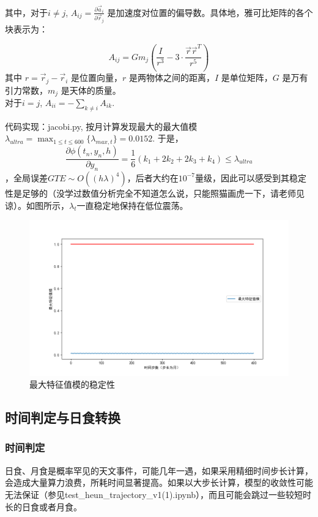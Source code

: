 \documentclass[hidelinks]{article}
\newcommand{\dps}{\displaystyle}
\begin{document}
其中，对于$i \neq j$, \( A_{ij} = \frac{\partial \vec{a}_i}{\partial \vec{r}_j} \) 是加速度对位置的偏导数。具体地，雅可比矩阵的各个块表示为：

\[
A_{ij} = G m_j \left( \frac{I}{r^3} - 3 \cdot \frac{\vec{r} \vec{r}^T}{r^5} \right)
\]
其中 \( r = \vec{r}_j - \vec{r}_i \) 是位置向量，\( r \) 是两物体之间的距离，\( I \) 是单位矩阵，\( G \) 是万有引力常数，\( m_j \) 是天体的质量。
\\
对于$i = j$, $\dps A_{ii} = - \sum_{k\neq i}A_{ik}$.

代码实现：jacobi.py, 按月计算发现最大的最大值模$\lambda_{ultra} = \max_{1\le t\le 600}\{\lambda_{max, t}\} = 0.0152$. 于是，
$$\frac{\partial \phi(t_n, y_n, h)}{\partial y_n} = \frac 1 6(k_1 + 2k_2 + 2k_3 + k_4) \le \lambda_{ultra}$$，全局误差$GTE \sim O((h\lambda)^4)$，后者大约在$10^{-7}$量级，因此可以感受到其稳定性是足够的（没学过数值分析完全不知道怎么说，只能照猫画虎一下，请老师见谅）。如图所示，$\lambda_t$一直稳定地保持在低位震荡。
\begin{figure}[h]
    \centering
    \includegraphics[width=0.8\linewidth]{images/Figure_12.png}
    \caption{最大特征值模的稳定性}
    \label{fig:enter-label}
\end{figure}

\subsection{时间判定与日食转换}

\subsubsection{时间判定}


日食、月食是概率罕见的天文事件，可能几年一遇，如果采用精细时间步长计算，会造成大量算力浪费，所耗时间显著提高。如果以大步长计算，模型的收敛性可能无法保证（参见test\_heun\_trajectory\_v1(1).ipynb），而且可能会跳过一些较短时长的日食或者月食。
\end{document}
